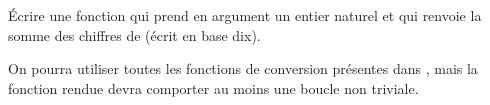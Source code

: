 Écrire une fonction  qui prend en argument un entier naturel  et qui renvoie la somme des chiffres de  (écrit en base dix). 

On pourra utiliser toutes les fonctions de conversion présentes dans \python{}, mais la fonction rendue devra comporter au moins une boucle non triviale.